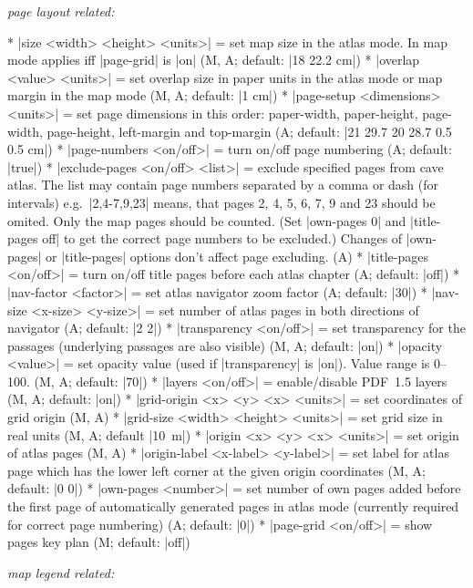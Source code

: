   {\it page layout related:}

  * |size <width> <height> <units>| = set map size in the atlas mode.
    In map mode applies iff |page-grid| is |on| (M, A; default: |18 22.2 cm|)
  * |overlap <value> <units>| = set overlap size in paper units in the atlas 
    mode or map margin in the map mode (M, A; default: |1 cm|)
  * |page-setup <dimensions> <units>| = set page dimensions in
    this order: paper-width, paper-height, page-width, page-height,
    left-margin and top-margin (A; default: |21 29.7 20 28.7 0.5 0.5 cm|)
  * |page-numbers <on/off>| = turn on/off page numbering (A; default: |true|)
  * |exclude-pages <on/off> <list>| = exclude specified pages from cave
    atlas. The list may contain page numbers separated by a comma or dash 
    (for intervals) e.g.~|2,4-7,9,23| means, that pages 2, 4, 5, 6, 7, 9 and 23 
    should be omited. Only the map pages should be counted. (Set |own-pages 0| 
    and |title-pages off| to get the correct page numbers to be excluded.) 
    Changes of |own-pages| or |title-pages| options don't affect page 
    excluding. (A)
  * |title-pages <on/off>| = turn on/off title pages before each atlas chapter
    (A; default: |off|)
  * |nav-factor <factor>| = set atlas navigator zoom factor (A; default: |30|)
  * |nav-size <x-size> <y-size>| = set number of atlas pages in 
    both directions of navigator (A; default: |2 2|)
  * |transparency <on/off>| = set transparency for the passages (underlying 
    passages are also visible) (M, A; default: |on|)
  * |opacity <value>| = set opacity value (used if |transparency| is |on|). 
    Value range is 0--100. (M, A; default: |70|)
  * |layers <on/off>| = enable/disable PDF~1.5 layers (M, A; default: |on|)
  * |grid-origin <x> <y> <x> <units>| = set coordinates of grid
    origin (M, A)
  * |grid-size <width> <height> <units>| = set grid size in real
    units (M, A; default \hbox{|10 m|})
  * |origin <x> <y> <x> <units>| = set origin of atlas pages (M, A)
  * |origin-label <x-label> <y-label>| = set label for atlas page
    which has the lower left corner at the given origin coordinates
    (M, A; default: |0 0|)
  * |own-pages <number>| = set number of own pages added before 
    the first page of automatically generated pages in atlas mode
    (currently required for correct page numbering) (A; default: |0|)
  * |page-grid <on/off>| = show pages key plan (M; default: |off|)

  {\it map legend related:}

